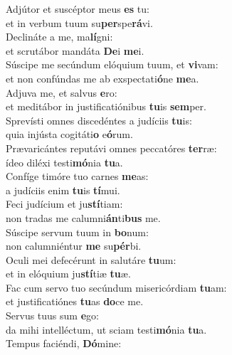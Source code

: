 \evenverse Adjútor et suscéptor meus \textbf{es} tu:~\*\\
\evenverse et in verbum tuum su\textbf{per}spe\textbf{rá}vi.\\
\oddverse Declináte a me, ma\textbf{lí}gni:~\*\\
\oddverse et scrutábor mandáta \textbf{De}i \textbf{me}i.\\
\evenverse Súscipe me secúndum elóquium tuum, et \textbf{vi}vam:~\*\\
\evenverse et non confúndas me ab exspectati\textbf{ó}ne \textbf{me}a.\\
\oddverse Adjuva me, et salvus \textbf{e}ro:~\*\\
\oddverse et meditábor in justificatiónibus \textbf{tu}is \textbf{sem}per.\\
\evenverse Sprevísti omnes discedéntes a judíciis \textbf{tu}is:~\*\\
\evenverse quia injústa cogitáti\textbf{o} e\textbf{ó}rum.\\
\oddverse Prævaricántes reputávi omnes peccatóres \textbf{ter}ræ:~\*\\
\oddverse ídeo diléxi testi\textbf{mó}nia \textbf{tu}a.\\
\evenverse Confíge timóre tuo carnes \textbf{me}as:~\*\\
\evenverse a judíciis enim \textbf{tu}is \textbf{tí}mui.\\
\oddverse Feci judícium et ju\textbf{stí}tiam:~\*\\
\oddverse non tradas me calumni\textbf{án}ti\textbf{bus} me.\\
\evenverse Súscipe servum tuum in \textbf{bo}num:~\*\\
\evenverse non calumniéntur \textbf{me} su\textbf{pér}bi.\\
\oddverse Oculi mei defecérunt in salutáre \textbf{tu}um:~\*\\
\oddverse et in elóquium ju\textbf{stí}tiæ \textbf{tu}æ.\\
\evenverse Fac cum servo tuo secúndum misericórdiam \textbf{tu}am:~\*\\
\evenverse et justificatiónes \textbf{tu}as \textbf{do}ce me.\\
\oddverse Servus tuus sum \textbf{e}go:~\*\\
\oddverse da mihi intelléctum, ut sciam testi\textbf{mó}nia \textbf{tu}a.\\
\evenverse Tempus faciéndi, \textbf{Dó}mine:~\*\\
